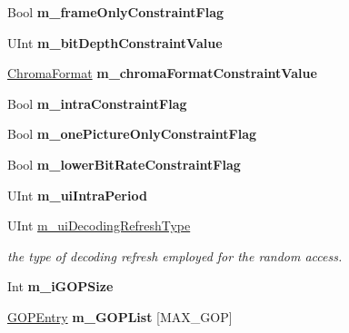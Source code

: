 \begin{DoxyCompactItemize}
\item 
\mbox{\label{class_t_enc_cfg_a47fcbe670749d6acadccc14c1395f069}} 
Bool {\bfseries m\+\_\+frame\+Only\+Constraint\+Flag}
\item 
\mbox{\label{class_t_enc_cfg_aa2f32c98712ec3469a5007074e6a390c}} 
U\+Int {\bfseries m\+\_\+bit\+Depth\+Constraint\+Value}
\item 
\mbox{\label{class_t_enc_cfg_a170908723488917599bb0aabd098e63f}} 
\hyperlink{_type_def_8h_a4a6c51c10f2eb04abc7209db7caff39f}{Chroma\+Format} {\bfseries m\+\_\+chroma\+Format\+Constraint\+Value}
\item 
\mbox{\label{class_t_enc_cfg_ad14de1a297bc6b22e6ca4403d035f171}} 
Bool {\bfseries m\+\_\+intra\+Constraint\+Flag}
\item 
\mbox{\label{class_t_enc_cfg_a89907c665e38066b5aaacf87535dcd0a}} 
Bool {\bfseries m\+\_\+one\+Picture\+Only\+Constraint\+Flag}
\item 
\mbox{\label{class_t_enc_cfg_aa1b4c806c88216a48296de49c5c74617}} 
Bool {\bfseries m\+\_\+lower\+Bit\+Rate\+Constraint\+Flag}
\item 
\mbox{\label{class_t_enc_cfg_a9e12532f4877b845275914a82a5757b9}} 
U\+Int {\bfseries m\+\_\+ui\+Intra\+Period}
\item 
\mbox{\label{class_t_enc_cfg_acf5a2670bd094e916bda1cd058251830}} 
U\+Int \hyperlink{class_t_enc_cfg_acf5a2670bd094e916bda1cd058251830}{m\+\_\+ui\+Decoding\+Refresh\+Type}
\begin{DoxyCompactList}\small\item\em the type of decoding refresh employed for the random access. \end{DoxyCompactList}\item 
\mbox{\label{class_t_enc_cfg_a3aed87c2791ce3d06f98b14f3932f867}} 
Int {\bfseries m\+\_\+i\+G\+O\+P\+Size}
\item 
\mbox{\label{class_t_enc_cfg_ac8ce03e468d51261f2afd9fb1207f08e}} 
\hyperlink{struct_g_o_p_entry}{G\+O\+P\+Entry} {\bfseries m\+\_\+\+G\+O\+P\+List} \mbox{[}M\+A\+X\+\_\+\+G\+OP\mbox{]}

\end{DoxyCompactItemize}
